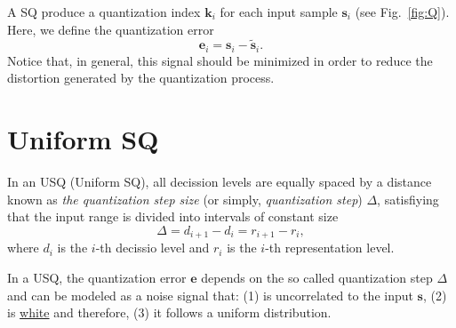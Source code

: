 A SQ produce a quantization index ${\mathbf k}_i$ for each input sample
${\mathbf s}_i$ (see Fig.~\ref{fig:Q}). Here, we define the quantization error
\begin{equation}
  {\mathbf e}_i = {\mathbf s}_i - \tilde{{\mathbf s}}_i.
\end{equation}
Notice that, in general, this signal should be minimized in order to
reduce the distortion generated by the quantization process.


\section{Uniform SQ}

In an USQ (Uniform SQ), all decission levels are equally spaced by a
distance known as \emph{the quantization step size} (or simply,
\emph{quantization step}) \(\Delta\), satisfiying that the input range
is divided into intervals of constant size
\begin{equation}
  \Delta=d_{i+1}-d_i=r_{i+1}-r_i,
\end{equation}
where $d_i$ is the $i$-th decissio level and $r_i$ is the $i$-th
representation level.

In a USQ, the quantization error ${\mathbf e}$ depends on the so
called quantization step $\Delta$ and can be modeled as a noise signal
that: (1) is uncorrelated to the input ${\mathbf s}$, (2) is
\href{https://en.wikipedia.org/wiki/White_noise}{white} and therefore,
(3) it follows a uniform distribution.



